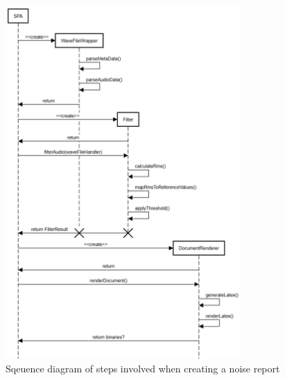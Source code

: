 \begin{figure}[H]
    \centering
    \includegraphics[width=0.8\textwidth]{../assets/sequence_diagram_from_wave_file_to_pdf.png}
    \caption{Sqeuence diagram of steps involved when creating a noise report}
\end{figure}

